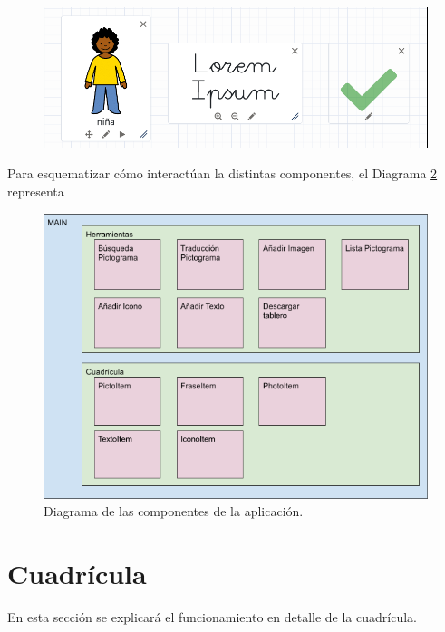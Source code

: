 \begin{itemize}
\begin{itemize}
	\end{itemize}

\begin{figure}[h!]
	\centering
	\includegraphics[width=0.7\linewidth]{Imagenes/Bitmap/items}
	\caption{}
	\label{fig:items}
\end{figure}
	
\end{itemize}

Para esquematizar cómo interactúan la distintas componentes, el Diagrama \ref{fig:diagramaarquitectura} representa 

\begin{figure}[h!]
	\centering
	\includegraphics[width=\linewidth]{Imagenes/Bitmap/diagramaarquitectura}
	\caption{Diagrama de las componentes de la aplicación.}
	\label{fig:diagramaarquitectura}
\end{figure}



\section{Cuadrícula}

En esta sección se explicará el funcionamiento en detalle de la cuadrícula. 

